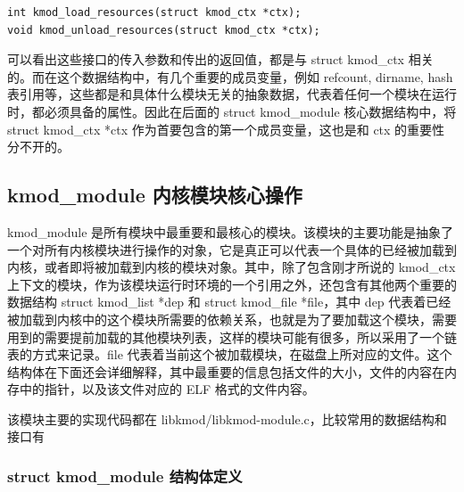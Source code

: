 {\begin{shaded}\begin{verbatim}
int kmod_load_resources(struct kmod_ctx *ctx);
void kmod_unload_resources(struct kmod_ctx *ctx);
\end{verbatim}\end{shaded}}
可以看出这些接口的传入参数和传出的返回值，都是与 struct kmod\_ctx
相关的。而在这个数据结构中，有几个重要的成员变量，例如 refcount, dirname,
hash表引用等，这些都是和具体什么模块无关的抽象数据，代表着任何一个模块在运行时，都必须具备的属性。因此在后面的
struct kmod\_module 核心数据结构中，将 struct kmod\_ctx *ctx
作为首要包含的第一个成员变量，这也是和 ctx 的重要性分不开的。

\subsection{kmod\_module 内核模块核心操作}

kmod\_module
是所有模块中最重要和最核心的模块。该模块的主要功能是抽象了一个对所有内核模块进行操作的对象，它是真正可以代表一个具体的已经被加载到内核，或者即将被加载到内核的模块对象。其中，除了包含刚才所说的
kmod\_ctx
上下文的模块，作为该模块运行时环境的一个引用之外，还包含有其他两个重要的数据结构
struct kmod\_list *dep 和 struct kmod\_file *file，其中 dep
代表着已经被加载到内核中的这个模块所需要的依赖关系，也就是为了要加载这个模块，需要用到的需要提前加载的其他模块列表，这样的模块可能有很多，所以采用了一个链表的方式来记录。file
代表着当前这个被加载模块，在磁盘上所对应的文件。这个结构体在下面还会详细解释，其中最重要的信息包括文件的大小，文件的内容在内存中的指针，以及该文件对应的
ELF 格式的文件内容。

该模块主要的实现代码都在
libkmod/libkmod-module.c，比较常用的数据结构和接口有

\subsubsection{struct kmod\_module 结构体定义}

